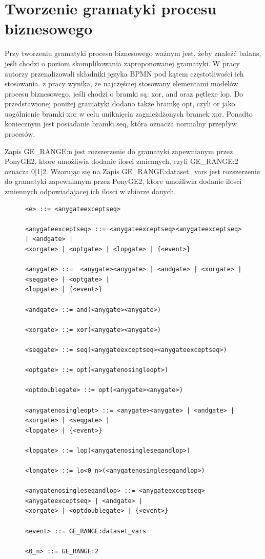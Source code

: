 \section{Tworzenie gramatyki procesu biznesowego}

Przy tworzeniu gramatyki procesu biznesowego ważnym jest, żeby znaleźć balans, jeśli chodzi o poziom skomplikowania zaproponowanej
gramatyki.  W pracy \cite{10.1007/978-3-540-69534-9_35} autorzy przenalizowali składniki języka BPMN pod kątem częstotliwości ich stosowania. z pracy wynika, że najczęściej stosowany elementami modelów procesu biznesowego, jeśli chodzi o bramki są: xor, and oraz pętlexe lop. Do przedstawionej poniżej gramatyki dodano także bramkę opt, czyli or jako uogólnienie bramki xor w celu uniknięcia zagnieżdżonych bramek xor. Ponadto koniecznym jest posiadanie bramki seq, która oznacza normalny przepływ procesów.

Zapis GE{\_}RANGE:n jest rozszerzenie do gramatyki zapewnianym przez PonyGE2, ktore umożliwia dodanie ilosci zmiennych, czyli GE{\_}RANGE:2 oznacza 0|1|2.
Wzorując się na  Zapis GE{\_}RANGE:dataset{\_}vars jest rozszerzenie do gramatyki zapewnianym przez PonyGE2, ktore umożliwia dodanie ilosci zmiennych odpowiadajacej ich ilosci w zbiorze danych.

\begin{figure}[!ht]
\lstset{caption=Gramatyka procesu biznesowego, captionpos=b}
\lstset{label=src:grammar, frame=single}
\begin{lstlisting}
<e> ::= <anygateexceptseq>

<anygateexceptseq> ::= <anygateexceptseq><anygateexceptseq> | <andgate> | 
<xorgate> | <optgate> | <lopgate> | {<event>}

<anygate> ::=  <anygate><anygate> | <andgate> | <xorgate> | <seqgate> | <optgate> | 
<lopgate> | {<event>}

<andgate> ::= and(<anygate><anygate>)

<xorgate> ::= xor(<anygate><anygate>)

<seqgate> ::= seq(<anygateexceptseq><anygateexceptseq>)

<optgate> ::= opt(<anygatenosingleopt>)

<optdoublegate> ::= opt(<anygate><anygate>)

<anygatenosingleopt> ::= <anygate><anygate> | <andgate> | <xorgate> | <seqgate> | 
<lopgate> | {<event>}

<lopgate> ::= lop(<anygatenosingleseqandlop>)

<longate> ::= lo<0_n>(<anygatenosingleseqandlop>)

<anygatenosingleseqandlop> ::= <anygateexceptseq><anygateexceptseq> | <andgate> | 
<xorgate> | <optdoublegate> | {<event>}

<event> ::= GE_RANGE:dataset_vars

<0_n> ::= GE_RANGE:2
\end{lstlisting}
\end{figure}

